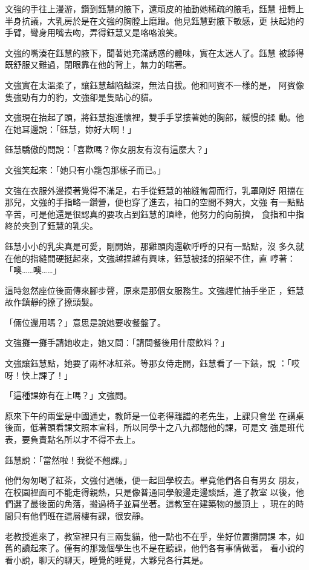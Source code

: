 文強的手往上漫游，鑽到鈺慧的腋下，還頑皮的抽動她稀疏的腋毛，鈺慧
扭轉上半身抗議，大乳房於是在文強的胸膛上磨蹭。他見鈺慧對腋下敏感，更
扶起她的手臂，彎身用嘴去吻，弄得鈺慧又是咯咯浪笑。

文強的嘴湊在鈺慧的腋下，聞著她充滿誘惑的體味，實在太迷人了。鈺慧
被舔得既舒服又難過，閉眼靠在他的背上，無力的喘著。

文強實在太溫柔了，讓鈺慧越陷越深，無法自拔。他和阿賓不一樣的是，
阿賓像隻強勁有力的豹，文強卻是隻貼心的貓。

文強現在抬起了頭，將鈺慧抱進懷裡，雙手手掌摟著她的胸部，緩慢的揉
動。他在她耳邊說：「鈺慧，妳好大啊！」

鈺慧驕傲的問說：「喜歡嗎？你女朋友有沒有這麼大？」

文強笑起來：「她只有小籠包那樣子而已。」

文強在衣服外邊摸著覺得不滿足，右手從鈺慧的袖縫匍匐而行，乳罩剛好
阻擋在那兒，文強的手指略一鑽營，便也穿了進去，袖口的空間不夠大，文強
有一點點辛苦，可是他還是很認真的要攻占到鈺慧的頂峰，他努力的向前擠，
食指和中指終於夾到了鈺慧的乳尖。

鈺慧小小的乳尖真是可愛，剛開始，那雞頭肉還軟呼呼的只有一點點，沒
多久就在他的指縫間硬挺起來，文強越捏越有興味，鈺慧被揉的招架不住，直
哼著：「噢……噢……」

這時忽然座位後面傳來腳步聲，原來是那個女服務生。文強趕忙抽手坐正
，鈺慧故作鎮靜的撩了撩頭髮。

「倆位還用嗎？」意思是說她要收餐盤了。

文強攤一攤手請她收走，她又問：「請問餐後用什麼飲料？」

文強讓鈺慧點，她要了兩杯冰紅茶。等那女侍走開，鈺慧看了一下錶，說
：「哎呀！快上課了！」

「這種課妳有在上嗎？」文強問。

原來下午的兩堂是中國通史，教師是一位老得離譜的老先生，上課只會坐
在講桌後面，低著頭看課文照本宣科，所以同學十之八九都翹他的課，可是文
強是班代表，要負責點名所以才不得不去上。

鈺慧說：「當然啦！我從不翹課。」

他們匆匆喝了紅茶，文強付過帳，便一起回學校去。畢竟他們各自有男女
朋友，在校園裡面可不能走得親熱，只是像普通同學般邊走邊談話，進了教室
以後，他們選了最後面的角落，搬過椅子並肩坐著。這教室在建築物的最頂上
，現在的時間只有他們班在這層樓有課，很安靜。

老教授進來了，教室裡只有三兩隻貓，他一點也不在乎，坐好位置攤開課
本，如舊的讀起來了。僅有的那幾個學生也不是在聽課，他們各有事情做著，
看小說的看小說，聊天的聊天，睡覺的睡覺，大夥兒各行其是。

